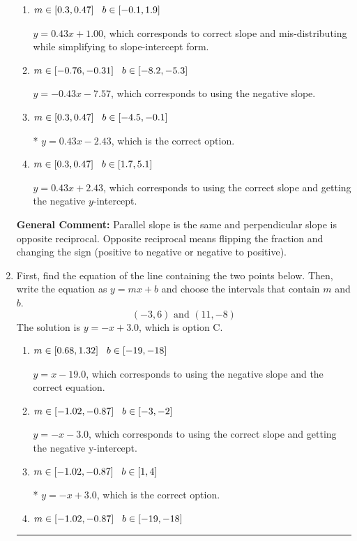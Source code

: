 \documentclass{extbook}[14pt]
\newcommand{\litem}[1]{\item #1

\rule{\textwidth}{0.4pt}}
\begin{document}
\begin{enumerate}
{\begin{enumerate}[label=\Alph*.]
 $y = 2.33x - 2.43$, which corresponds to using the reciprocal slope $(1/m)$.
\item \( m \in [0.3, 0.47] \hspace*{3mm} b \in [-0.1, 1.9] \)

 $y = 0.43x + 1.00$, which corresponds to correct slope and mis-distributing while simplifying to slope-intercept form.
\item \( m \in [-0.76, -0.31] \hspace*{3mm} b \in [-8.2, -5.3] \)

 $y = -0.43x - 7.57$, which corresponds to using the negative slope.
\item \( m \in [0.3, 0.47] \hspace*{3mm} b \in [-4.5, -0.1] \)

* $y = 0.43x - 2.43$, which is the correct option.
\item \( m \in [0.3, 0.47] \hspace*{3mm} b \in [1.7, 5.1] \)

 $y = 0.43x + 2.43$, which corresponds to using the correct slope and getting the negative $y$-intercept.
\end{enumerate}

\textbf{General Comment:} Parallel slope is the same and perpendicular slope is opposite reciprocal. Opposite reciprocal means flipping the fraction and changing the sign (positive to negative or negative to positive).
}
\litem{
First, find the equation of the line containing the two points below. Then, write the equation as $ y=mx+b $ and choose the intervals that contain $m$ and $b$.
\[ (-3, 6) \text{ and } (11, -8) \]The solution is \( y = -x + 3.0 \), which is option C.\begin{enumerate}[label=\Alph*.]
\item \( m \in [0.68, 1.32] \hspace*{3mm} b \in [-19, -18] \)

 $y = x -19.0$, which corresponds to using the negative slope and the correct equation.
\item \( m \in [-1.02, -0.87] \hspace*{3mm} b \in [-3, -2] \)

 $y = -x -3.0$, which corresponds to using the correct slope and getting the negative y-intercept.
\item \( m \in [-1.02, -0.87] \hspace*{3mm} b \in [1, 4] \)

* $y = -x + 3.0$, which is the correct option.
\item \( m \in [-1.02, -0.87] \hspace*{3mm} b \in [-19, -18] \)


\end{enumerate}}
\end{enumerate}
\end{document}
